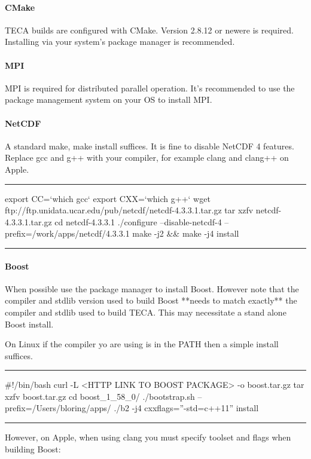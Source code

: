 \documentclass[a4paper,10pt,DIV=12]{scrreprt}
\newenvironment{code}{%
\center
\minipage{0.9\textwidth}
\hrule\vspace{2mm}
\small
\verbatim
}{%
\endverbatim
\vspace{-1mm}\hrule
\endminipage
\endcenter
}
\begin{document}
\paragraph{CMake}
TECA builds are configured with CMake. Version 2.8.12 or newere is required.
Installing via your system's package manager is recommended.

\paragraph{MPI}
MPI is required for distributed parallel operation. It's recommended to use
the package management system on your OS to install MPI.

\paragraph{NetCDF}
A standard make, make install suffices. It is fine to disable NetCDF 4 features. Replace
gcc and g++ with your compiler, for example clang and clang++ on Apple.

\begin{code}
export CC=`which gcc`
export CXX=`which g++`
wget ftp://ftp.unidata.ucar.edu/pub/netcdf/netcdf-4.3.3.1.tar.gz
tar xzfv netcdf-4.3.3.1.tar.gz
cd netcdf-4.3.3.1
./configure --disable-netcdf-4 --prefix=/work/apps/netcdf/4.3.3.1
make -j2 && make -j4 install
\end{code}

\paragraph{Boost}
When possible use the package manager to install Boost. However note that the
compiler and stdlib version used to build Boost **needs to match exactly** the
compiler and stdlib used to build TECA. This may necessitate a stand alone
Boost install.

On Linux if the compiler yo are using is in the PATH then a simple install
suffices.
\begin{code}
#!/bin/bash
curl -L <HTTP LINK TO BOOST PACKAGE> -o boost.tar.gz
tar xzfv boost.tar.gz
cd boost_1_58_0/
./bootstrap.sh --prefix=/Users/bloring/apps/
./b2 -j4 cxxflags=''-std=c++11'' install
\end{code}

However, on Apple, when using clang you must specify toolset and flags when
building Boost:
\end{document}

